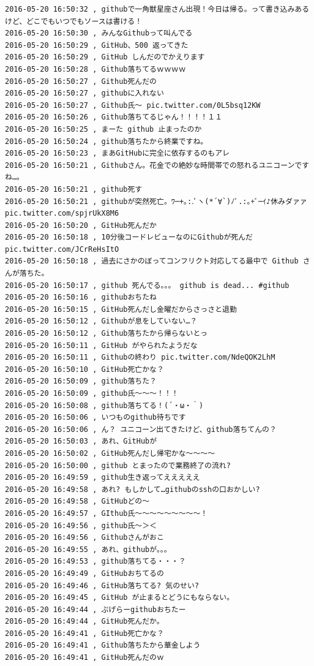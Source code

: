 \begin{verbatim}
2016-05-20 16:50:32 , githubで一角獣星座さん出現！今日は帰る。って書き込みあるけど、どこでもいつでもソースは書ける！
2016-05-20 16:50:30 , みんなGithubって叫んでる
2016-05-20 16:50:29 , GitHub、500 返ってきた
2016-05-20 16:50:29 , GitHub しんだのでかえります
2016-05-20 16:50:28 , Github落ちてるｗｗｗｗ
2016-05-20 16:50:27 , Github死んだの
2016-05-20 16:50:27 , githubに入れない
2016-05-20 16:50:27 , Github氏〜 pic.twitter.com/0L5bsq12KW
2016-05-20 16:50:26 , Github落ちてるじゃん！！！！１１
2016-05-20 16:50:25 , まーた github 止まったのか
2016-05-20 16:50:24 , github落ちたから終業ですね。
2016-05-20 16:50:23 , まあGitHubに完全に依存するのもアレ
2016-05-20 16:50:21 , Githubさん。花金での絶妙な時間帯での怒れるユニコーンですね…。
2016-05-20 16:50:21 , github死す
2016-05-20 16:50:21 , githubが突然死亡。ﾜ─+｡:.ﾟヽ(*´∀`)ﾉﾟ.:｡+ﾟ─ｲ♪休みダァァ pic.twitter.com/spjrUkX8M6
2016-05-20 16:50:20 , GitHub死んだか
2016-05-20 16:50:18 , 10分後コードレビューなのにGithubが死んだ
pic.twitter.com/JCrReHsItO
2016-05-20 16:50:18 , 過去にさかのぼってコンフリクト対応してる最中で Github さんが落ちた。
2016-05-20 16:50:17 , github 死んでる。。。 github is dead... #github
2016-05-20 16:50:16 , githubおちたね
2016-05-20 16:50:15 , GitHub死んだし金曜だからさっさと退勤
2016-05-20 16:50:12 , Githubが息をしていない…？
2016-05-20 16:50:12 , Github落ちたから帰らないとっ
2016-05-20 16:50:11 , GitHub がやられたようだな
2016-05-20 16:50:11 , Githubの終わり pic.twitter.com/NdeQOK2LhM
2016-05-20 16:50:10 , GitHub死亡かな？
2016-05-20 16:50:09 , github落ちた？
2016-05-20 16:50:09 , github氏〜〜〜！！！
2016-05-20 16:50:08 , github落ちてる！(´・ω・｀)
2016-05-20 16:50:06 , いつものgithub待ちです
2016-05-20 16:50:06 , ん？ ユニコーン出てきたけど、github落ちてんの？
2016-05-20 16:50:03 , あれ、GitHubが
2016-05-20 16:50:02 , GitHub死んだし帰宅かな～～～～
2016-05-20 16:50:00 , github とまったので業務終了の流れ?
2016-05-20 16:49:59 , github生き返ってえええええ
2016-05-20 16:49:58 , あれ? もしかして…githubのsshの口おかしい?
2016-05-20 16:49:58 , GitHubどの〜
2016-05-20 16:49:57 , GIthub氏〜〜〜〜〜〜〜〜〜！
2016-05-20 16:49:56 , github氏〜＞＜
2016-05-20 16:49:56 , Githubさんがおこ
2016-05-20 16:49:55 , あれ、githubが。。。
2016-05-20 16:49:53 , github落ちてる・・・？
2016-05-20 16:49:49 , GitHubおちてるの
2016-05-20 16:49:46 , GitHub落ちてる? 気のせい?
2016-05-20 16:49:45 , GitHub が止まるとどうにもならない。
2016-05-20 16:49:44 , ぷげらーgithubおちたー
2016-05-20 16:49:44 , GitHub死んだか。
2016-05-20 16:49:41 , GitHub死亡かな？
2016-05-20 16:49:41 , Github落ちたから華金しよう
2016-05-20 16:49:41 , GitHub死んだのｗ

\end{verbatim}
